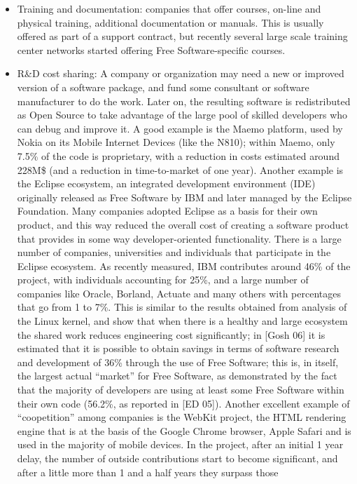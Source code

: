 \begin{itemize}
 \item Training and documentation: companies that offer courses, on-line and
physical training, additional documentation or manuals. This is usually offered
as part of a support contract, but recently several large scale training center
networks started offering Free Software-specific courses.
 \item R\&D cost sharing: A company or organization may need a new or improved
version of a software package, and fund some consultant or software manufacturer
to do the work. Later on, the resulting software is redistributed as Open Source
to take advantage of the large pool of skilled developers who can debug and
improve it. A good example is the Maemo platform, used by Nokia on its Mobile
Internet Devices (like the N810); within Maemo, only 7.5\% of the code is
proprietary, with a reduction in costs estimated around 228M\$ (and a reduction in
time-to-market of one year). Another example is the Eclipse ecosystem, an
integrated development environment (IDE) originally released as Free Software by
IBM and later managed by the Eclipse Foundation. Many companies adopted Eclipse
as a basis for their own product, and this way reduced the overall cost of
creating a software product that provides in some way developer-oriented
functionality. There is a large number of companies, universities and individuals
that participate in the Eclipse ecosystem. As
recently measured, IBM contributes around 46\% of the project, with
individuals accounting for 25\%, and a large number of companies like Oracle,
Borland, Actuate and many others with percentages that go from 1 to 7\%. This is
similar to the results obtained from analysis of the Linux kernel, and show that
when there is a healthy and large ecosystem the shared work reduces engineering
cost significantly; in [Gosh 06] it is estimated that it is possible to obtain
savings in terms of software research and development of 36\% through the use of
Free Software; this is, in itself, the largest actual ``market'' for Free
Software, as demonstrated by the fact that the majority of developers are using
at least some Free Software within their own code (56.2\%, as reported in [ED
05]). Another excellent example of ``coopetition'' among companies is the WebKit
project, the HTML rendering engine that is at the basis of the Google Chrome
browser, Apple Safari and is used in the majority of mobile devices. In the project,
after an initial 1 year delay, the number of outside contributions start to become
significant, and after a little more than 1 and a half years they surpass those

\end{itemize}
